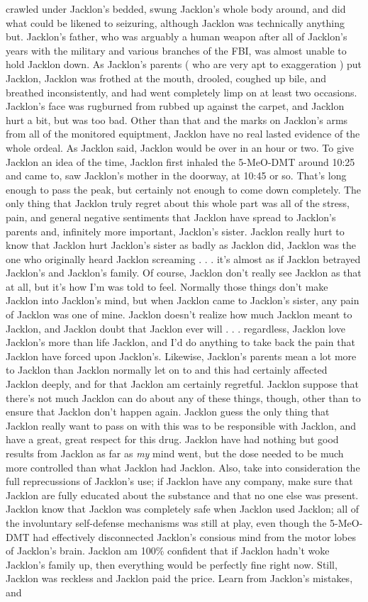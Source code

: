 \documentclass[12pt]{book}
\begin{document}
crawled under Jacklon's bedded, swung Jacklon's whole body around, and did what could be likened to seizuring, although Jacklon was technically anything but. Jacklon's father, who was arguably a human weapon after all of Jacklon's years with the military and various branches of the FBI, was almost unable to hold Jacklon down. As Jacklon's parents ( who are very apt to exaggeration ) put Jacklon, Jacklon was frothed at the mouth, drooled, coughed up bile, and breathed inconsistently, and had went completely limp on at least two occasions. Jacklon's face was rugburned from rubbed up against the carpet, and Jacklon hurt a bit, but was too bad. Other than that and the marks on Jacklon's arms from all of the monitored equiptment, Jacklon have no real lasted evidence of the whole ordeal. As Jacklon said, Jacklon would be over in an hour or two. To give Jacklon an idea of the time, Jacklon first inhaled the 5-MeO-DMT around 10:25 and came to, saw Jacklon's mother in the doorway, at 10:45 or so. That's long enough to pass the peak, but certainly not enough to come down completely. The only thing that Jacklon truly regret about this whole part was all of the stress, pain, and general negative sentiments that Jacklon have spread to Jacklon's parents and, infinitely more important, Jacklon's sister. Jacklon really hurt to know that Jacklon hurt Jacklon's sister as badly as Jacklon did, Jacklon was the one who originally heard Jacklon screaming . . .  it's almost as if Jacklon betrayed Jacklon's and Jacklon's family. Of course, Jacklon don't really see Jacklon as that at all, but it's how I'm was told to feel. Normally those things don't make Jacklon into Jacklon's mind, but when Jacklon came to Jacklon's sister, any pain of Jacklon was one of mine. Jacklon doesn't realize how much Jacklon meant to Jacklon, and Jacklon doubt that Jacklon ever will . . .  regardless, Jacklon love Jacklon's more than life Jacklon, and I'd do anything to take back the pain that Jacklon have forced upon Jacklon's. Likewise, Jacklon's parents mean a lot more to Jacklon than Jacklon normally let on to and this had certainly affected Jacklon deeply, and for that Jacklon am certainly regretful. Jacklon suppose that there's not much Jacklon can do about any of these things, though, other than to ensure that Jacklon don't happen again. Jacklon guess the only thing that Jacklon really want to pass on with this was to be responsible with Jacklon, and have a great, great respect for this drug. Jacklon have had nothing but good results from Jacklon as far as \emph{my} mind went, but the dose needed to be much more controlled than what Jacklon had Jacklon. Also, take into consideration the full reprecussions of Jacklon's use; if Jacklon have any company, make sure that Jacklon are fully educated about the substance and that no one else was present. Jacklon know that Jacklon was completely safe when Jacklon used Jacklon; all of the involuntary self-defense mechanisms was still at play, even though the 5-MeO-DMT had effectively disconnected Jacklon's consious mind from the motor lobes of Jacklon's brain. Jacklon am 100\% confident that if Jacklon hadn't woke Jacklon's family up, then everything would be perfectly fine right now. Still, Jacklon was reckless and Jacklon paid the price. Learn from Jacklon's mistakes, and 
\end{document}
